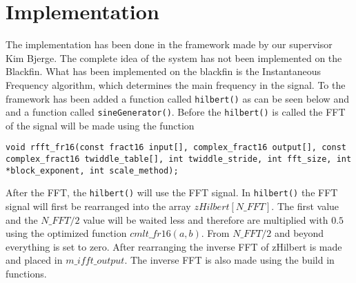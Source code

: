 
\section{Implementation}
\label{sec:impl}
The implementation has been done in the framework made by our supervisor Kim Bjerge.
The complete idea of the system has not been implemented on the Blackfin.
What has been implemented on the blackfin is the Instantaneous Frequency algorithm, which determines the main frequency in the signal.
To the framework has been added a function called \texttt{hilbert()} as can be seen below and and a function called \texttt{sineGenerator()}.
Before the \texttt{hilbert()} is called the FFT of the signal will be made using the function 

\begin{verbatim}
void rfft_fr16(const fract16 input[], complex_fract16 output[], const complex_fract16 twiddle_table[], int twiddle_stride, int fft_size, int *block_exponent, int scale_method);
\end{verbatim}

After the FFT, the \texttt{hilbert()} will use the FFT signal. In \texttt{hilbert()} the FFT signal will first be rearranged into the array $zHilbert[N\_FFT]$.
The first value and the $N\_FFT/2$ value will be waited less and therefore are multiplied with $0.5$ using the optimized function $cmlt\_fr16(a,b)$.
From $N\_FFT/2$ and beyond everything is set to zero. 
After rearranging the inverse FFT of zHilbert is made and placed in $m\_ifft\_output$.
The inverse FFT is also made using the build in functions.

